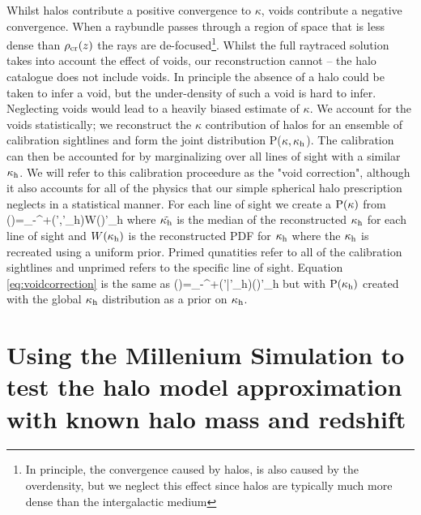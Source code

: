 \documentclass[useAMS,usenatbib]{mn2e}
\begin{document}
Whilst halos contribute a positive convergence to $\kappa$, voids contribute
a negative convergence. When a raybundle passes through a  region of space
that is less dense than $\rho_{\rm cr}(z)$ the rays are de-focused\footnote{In
principle, the convergence caused by halos, is also caused by the overdensity,
but we neglect this effect since halos are typically much more dense than the
intergalactic medium}. Whilst the  full raytraced solution takes into account
the effect of voids, our reconstruction cannot -- the halo catalogue does not
include voids. In principle the absence of a halo could be taken to infer a
void, but the under-density of such a void is hard to infer. Neglecting voids
would lead to a heavily biased estimate of $\kappa$. We account for the voids
statistically; we reconstruct
the $\kappa$ contribution of halos for an ensemble of calibration sightlines
and form the joint distribution P($\kappa,\kappa_{\rm h}$). The calibration
can then be accounted for by marginalizing over all lines of sight with a similar
 $\kappa_{\rm h}$.  We will refer to this calibration proceedure as the "void correction",
although it also accounts for all of the physics that our simple spherical halo prescription
neglects in a statistical manner. For each line of sight we create a ${\rm P}(\kappa)$ from
\be
\label{eq:voidcorrection}
\pr(\kappax)=\int_{-\infty}^{+\infty}\pr(\kapparay',\tilde\kappa'_{\rm h})W(\kappah)\dee \tilde\kappa'_{\rm h}
\ee
where $\tilde{\kappa_{\rm h}}$ is the median of the reconstructed $\kappa_{\rm h}$ for each line of sight and $W(\kappa_{\rm h})$ is the reconstructed PDF for $\kappa_{\rm h}$ where the $\kappa_{\rm h}$ is recreated using a uniform prior.
Primed qunatities refer to all of the calibration sightlines and unprimed refers to the specific line of sight. Equation \ref{eq:voidcorrection} is the same as 
\be
\label{eq:voidcorrection2}
\pr(\kappax)=\int_{-\infty}^{+\infty}\pr(\kapparay'|\tilde\kappa'_{\rm h})\pr(\kappah)\dee \tilde\kappa'_{\rm h}
\ee
but with ${\rm P}(\kappa_{\rm h})$ created with the global $\kappa_{\rm h}$ distribution as a prior on $\kappa_{\rm h}$.




\section{Using the Millenium Simulation to test the halo model approximation with known halo mass and redshift}
\label{sec:knownMh+z} 
\end{document}
